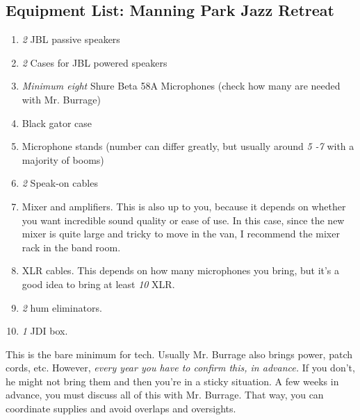 \documentclass[letterpaper,10pt,oneside,headsepline]{scrreprt}
\begin{document}
\subsection{Equipment List: Manning Park Jazz Retreat}
\begin{enumerate}
\item \textit{2} JBL passive speakers
\item \textit{2} Cases for JBL powered speakers
\item \textit{Minimum eight} Shure Beta 58A Microphones (check how many are needed with Mr. Burrage)
\item Black gator case
\item Microphone stands (number can differ greatly, but usually around \textit{5 -7} with a majority of booms)
\item \textit{2} Speak-on cables
\item Mixer and amplifiers. This is also up to you, because it depends on whether you want incredible sound quality or ease of use. In this case, since the new mixer is quite large and tricky to move in the van, I recommend the mixer rack in the band room.
\item XLR cables. This depends on how many microphones you bring, but it's a good idea to bring at least \textit{10} XLR.
\item \textit{2} hum eliminators.
\item \textit{1} JDI box.
\end{enumerate}
This is the bare minimum for tech. Usually Mr. Burrage also brings power, patch cords, etc. However, \textit{every year you have to confirm this, in advance.} If you don't, he might not bring them and then you're in a sticky situation. A few weeks in advance, you must discuss all of this with Mr. Burrage. That way, you can coordinate supplies and avoid overlaps and oversights.
\end{document}

